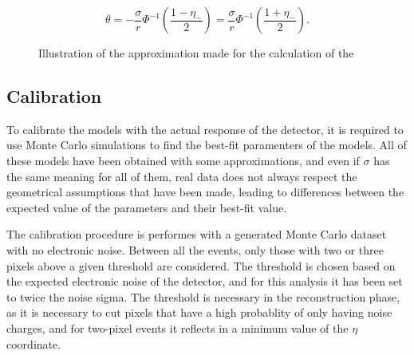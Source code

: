 \begin{equation}
\theta = - \frac{\sigma}{r} \Phi^{-1} \left( \frac{1 - \eta_-}{2} \right) = \frac{\sigma}{r} \Phi^{-1} \left( \frac{1 + \eta_-}{2} \right).
\end{equation}


\begin{figure}[t]
    \centering
    \caption{Illustration of the approximation made for the calculation of the  }
    \label{fig:angular_3pix}
\end{figure}

\subsection{Calibration}

To calibrate the models with the actual response of the detector, it is required to use Monte Carlo simulations to find the best-fit paramenters of the models. All of these models have been obtained with some approximations, and even if $\sigma$ has the same meaning for all of them, real data does not always respect the geometrical assumptions that have been made, leading to differences between the expected value of the parameters and their best-fit value.

The calibration procedure is performes with a generated Monte Carlo dataset with no electronic noise. Between all the events, only those with two or three pixels above a given threshold are considered. The threshold is chosen based on the expected electronic noise of the detector, and for this analysis it has been set to twice the noise sigma. The threshold is necessary in the reconstruction phase, as it is necessary to cut pixels that have a high probablity of only having noise charges, and for two-pixel events it reflects in a minimum value of the $\eta$ coordinate.

